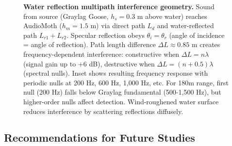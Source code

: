 \documentclass[twocolumn]{article}
\begin{document}
\begin{figure}[t]
\caption{\textbf{Water reflection multipath interference geometry.} Sound from source (Graylag Goose, $h_s = 0.3$ m above water) reaches AudioMoth ($h_m = 1.5$ m) via direct path $L_d$ and water-reflected path $L_{r1} + L_{r2}$. Specular reflection obeys $\theta_i = \theta_r$ (angle of incidence = angle of reflection). Path length difference $\Delta L \approx 0.85$ m creates frequency-dependent interference: constructive when $\Delta L = n\lambda$ (signal gain up to +6 dB), destructive when $\Delta L = (n+0.5)\lambda$ (spectral nulls). Inset shows resulting frequency response with periodic nulls at 200 Hz, 600 Hz, 1,000 Hz, etc. For 180m range, first null (200 Hz) falls below Graylag fundamental (500-1,500 Hz), but higher-order nulls affect detection. Wind-roughened water surface reduces interference by scattering reflections diffusely.}
\label{fig:water_reflection_physics}
\end{figure}

\subsection{Recommendations for Future Studies}
\end{document}
